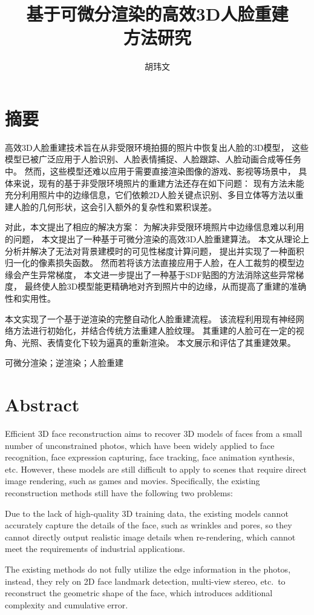 \documentclass{scutmaster}
\title{基于可微分渲染的高效3D人脸重建\texorpdfstring{\\}{}方法研究}
\author{胡玮文}
\begin{document}
\maketitle
\hideinblind{
    \maketitleEN
    \nominationpage
    \declareoforiginality
}

\frontmatter
\chapter{摘\texorpdfstring{\quad}{}要}

高效3D人脸重建技术旨在从非受限环境拍摄的照片中恢复出人脸的3D模型，
这些模型已被广泛应用于人脸识别、人脸表情捕捉、人脸跟踪、人脸动画合成等任务中。
然而，这些模型还难以应用于需要直接渲染图像的游戏、影视等场景中，
具体来说，现有的基于非受限环境照片的重建方法还存在如下问题：
现有方法未能充分利用照片中的边缘信息，它们依赖2D人脸关键点识别、多目立体等方法以重建人脸的几何形状，这会引入额外的复杂性和累积误差。

对此，本文提出了相应的解决方案：
为解决非受限环境照片中边缘信息难以利用的问题，
本文提出了一种基于可微分渲染的高效3D人脸重建算法。
本文从理论上分析并解决了无法对背景建模时的可见性梯度计算问题，
提出并实现了一种面积归一化的像素损失函数。
然而若将该方法直接应用于人脸，在人工裁剪的模型边缘会产生异常梯度，
本文进一步提出了一种基于SDF贴图的方法消除这些异常梯度，
最终使人脸3D模型能更精确地对齐到照片中的边缘，从而提高了重建的准确性和实用性。

本文实现了一个基于逆渲染的完整自动化人脸重建流程。
该流程利用现有神经网络方法进行初始化，并结合传统方法重建人脸纹理。
其重建的人脸可在一定的视角、光照、表情变化下较为逼真的重新渲染。
本文展示和评估了其重建效果。

 可微分渲染；逆渲染；人脸重建

\chapter{Abstract}

Efficient 3D face reconstruction aims to recover 3D models of faces from a small number of unconstrained photos,
which have been widely applied to face recognition, face expression capturing, face tracking, face animation synthesis, etc.
However, these models are still difficult to apply to scenes that require direct image rendering, such as games and movies.
Specifically, the existing reconstruction methods still have the following two problems:
\begin{enumerate*}
\item Due to the lack of high-quality 3D training data, the existing models cannot accurately capture the details of the face,
such as wrinkles and pores,
so they cannot directly output realistic image details when re-rendering, which cannot meet the requirements of industrial applications.
\item The existing methods do not fully utilize the edge information in the photos,
instead, they rely on 2D face landmark detection, multi-view stereo, etc.\ to reconstruct the geometric shape of the face,
which introduces additional complexity and cumulative error.
\end{enumerate*}
\end{document}

